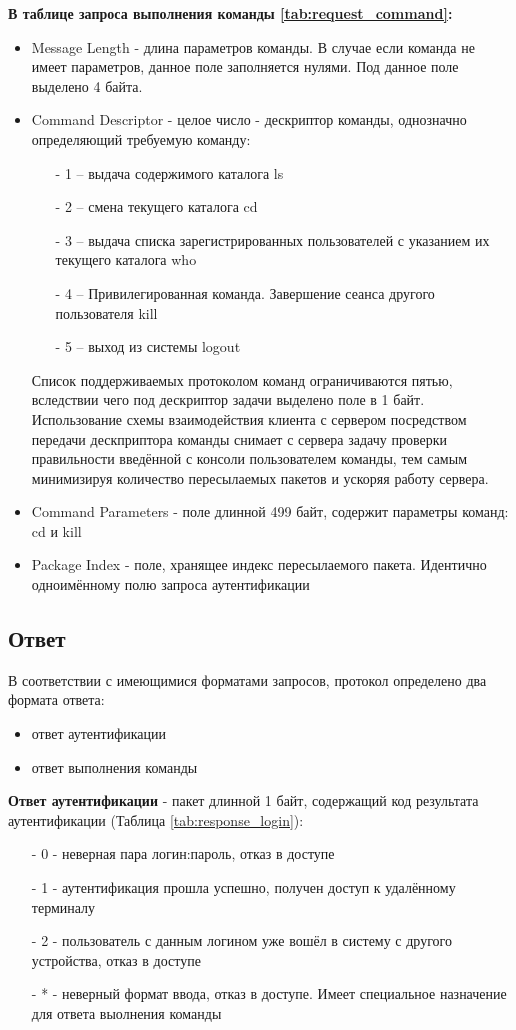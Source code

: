 \textbf{В таблице запроса выполнения команды \ref{tab:request_command}:}
\begin{itemize}
\item Message Length - длина параметров команды. В случае если команда не имеет параметров, данное поле заполняется нулями. Под данное поле выделено 4 байта.
\item Command Descriptor - целое число - дескриптор команды, однозначно определяющий требуемую команду:
\begin{itemize}
\item[-] 1 – выдача содержимого каталога ls
\item[-] 2 – смена текущего каталога cd
\item[-] 3 – выдача списка зарегистрированных пользователей с указанием их текущего каталога who
\item[-] 4 – Привилегированная команда. Завершение сеанса другого пользователя kill
\item[-] 5 – выход из системы logout
\end{itemize}
Список поддерживаемых протоколом команд ограничиваются пятью, вследствии чего под дескриптор задачи выделено поле в 1 байт. Использование схемы взаимодействия клиента с сервером посредством передачи дескприптора команды снимает с сервера задачу проверки правильности введённой с консоли пользователем команды, тем самым минимизируя количество пересылаемых пакетов и ускоряя работу сервера.

\item Command Parameters - поле длинной 499 байт, содержит параметры команд: cd и kill
\item Package Index - поле, хранящее индекс пересылаемого пакета. Идентично одноимённому полю запроса аутентификации
\end{itemize}

\subsection{Ответ}
В соответствии с имеющимися форматами запросов, протокол определено два формата ответа:
\begin{itemize}
\item ответ аутентификации
\item ответ выполнения команды
\end{itemize}

\textbf{Ответ аутентификации} - пакет длинной 1 байт, содержащий код результата аутентификации (Таблица \ref{tab:response_login}):
\begin{itemize}
\item[-] 0 - неверная пара логин:пароль, отказ в доступе
\item[-] 1 - аутентификация прошла успешно, получен доступ к удалённому терминалу
\item[-] 2 - пользователь с данным логином уже вошёл в систему с другого устройства, отказ в доступе
\item[-] * - неверный формат ввода, отказ в доступе. Имеет специальное назначение для ответа выолнения команды
\end{itemize}

